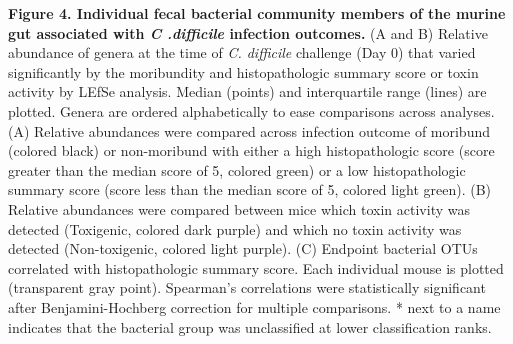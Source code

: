 \documentclass[
  12pt,
]{article}
\begin{document}
\textbf{Figure 4. Individual fecal bacterial community members of the
murine gut associated with \emph{C .difficile} infection outcomes.} (A
and B) Relative abundance of genera at the time of \emph{C. difficile}
challenge (Day 0) that varied significantly by the moribundity and
histopathologic summary score or toxin activity by LEfSe analysis.
Median (points) and interquartile range (lines) are plotted. Genera are
ordered alphabetically to ease comparisons across analyses. (A) Relative
abundances were compared across infection outcome of moribund (colored
black) or non-moribund with either a high histopathologic score (score
greater than the median score of 5, colored green) or a low
histopathologic summary score (score less than the median score of 5,
colored light green). (B) Relative abundances were compared between mice
which toxin activity was detected (Toxigenic, colored dark purple) and
which no toxin activity was detected (Non-toxigenic, colored light
purple). (C) Endpoint bacterial OTUs correlated with histopathologic
summary score. Each individual mouse is plotted (transparent gray
point). Spearman's correlations were statistically significant after
Benjamini-Hochberg correction for multiple comparisons. * next to a name
indicates that the bacterial group was unclassified at lower
classification ranks.

\hfill\break
\end{document}
